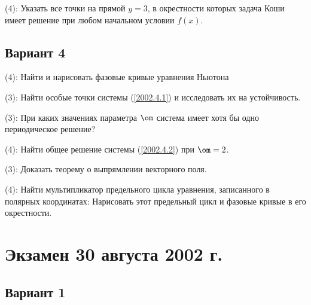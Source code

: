 \documentclass[a4paper]{article}
\newcommand{\skill}[1]{\textsf{(#1):}}
\begin{document}
\begin{problem}
\skill{4}
Указать все точки на прямой $y=3$, в окрестности которых задача Коши
имеет решение при любом начальном условии $f(x)$.
\end{problem}

\subsection{Вариант 4}

\begin{problem}
\skill{4}
Найти и нарисовать фазовые кривые уравнения Ньютона
\end{problem}

\begin{problem}
\skill{3} Найти особые точки системы (\ref{2002.4.1}) и исследовать их на устойчивость.
\end{problem}

\begin{problem}
\skill{3} При каких значениях параметра $\om$ система
имеет хотя бы одно периодическое решение?
\end{problem}

\begin{problem}
\skill{4} Найти общее решение системы (\ref{2002.4.2}) при $\om = 2$.
\end{problem}

\begin{problem}
\skill{3} Доказать теорему о выпрямлении векторного поля.
\end{problem}

\begin{problem}
\skill{4} Найти мультипликатор предельного цикла уравнения, записанного в полярных координатах:
Нарисовать этот предельный цикл и фазовые кривые в его окрестности.
\end{problem}

\section{Экзамен 30 августа 2002 г.}

\subsection{Вариант 1}
\end{document}
